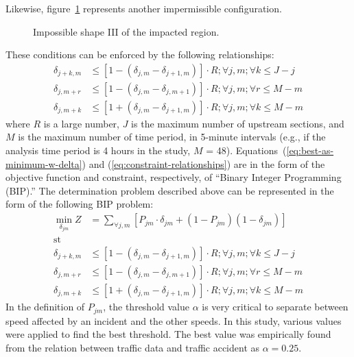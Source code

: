 \documentclass[12pt]{report}
\newcommand{\inputTikZ}[1]{%
    \begin{singlespace}
    \end{singlespace}
  }
\newcommand{\inputTikZ}[1]{%
    \begin{singlespace}
    \beginpgfgraphicnamed{#1-external}%
    \endpgfgraphicnamed%
    \end{singlespace}
  }
\newcounter{time}
\newcounter{space}
\begin{document}
Likewise, figure~\ref{fig:time-space-incident-schematic-infeasible-3}
represents another impermissible configuration.
\begin{figure}[t]
  \begin{center}
    \inputTikZ{figs/time-space-incident-schematic-infeasible-3}
    \caption[Impossible shape III of the impacted region]{Impossible shape III of the impacted region.}
    \label{fig:time-space-incident-schematic-infeasible-3}
  \end{center}
\end{figure}
These conditions can be enforced by the following relationships:
\begin{subequations}
  \label{eq:constraint-relationships}
  \begin{align}
    \label{eq:constraint-relationship-a}
    \delta_{j+k,m} &\le \left[1 - (\delta_{j,m} - \delta_{j+1,m})\right]\cdot{}R; \forall{}j, m; \forall{}k \le J - j\\
    \label{eq:constraint-relationship-b}        
    \delta_{j,m+r} & \le \left[1 - (\delta_{j,m} - \delta_{j,m+1})\right]\cdot{}R; \forall{}j, m; \forall{}r \le M - m\\
    \label{eq:constraint-relationship-c}            
    \delta_{j,m+k} & \le \left[1 + (\delta_{j,m} - \delta_{j+1,m})\right]\cdot{}R; \forall{}j, m; \forall{}k \le M - m
  \end{align}
\end{subequations}
where $R$ is a large number, $J$ is the maximum number of upstream
sections, and $M$ is the maximum number of time period, in 5-minute
intervals (e.g., if the analysis time period is 4 hours in the study,
$M$ = 48).  Equations~(\ref{eq:best-as-minimum-w-delta}) and
(\ref{eq:constraint-relationships}) are in the form of the objective
function and constraint, respectively, of ``Binary Integer Programming
(BIP).'' The determination problem described above can be represented
in the form of the following BIP problem:
\begin{equation}
  \begin{split}
  \label{eq:bip-formulation}
  \min\limits_{\delta_{jm}} Z & = \sum\limits_{\forall{}j,m}\left[P_{jm}\cdot{}\delta_{jm}+(1-P_{jm})(1-\delta_{jm})\right] \\
  \textrm{st}~~~~~~~~~&\\
    \delta_{j+k,m} &\le \left[1 - (\delta_{j,m} - \delta_{j+1,m})\right]\cdot{}R; \forall{}j, m; \forall{}k \le J - j\\
    \delta_{j,m+r} & \le \left[1 - (\delta_{j,m} - \delta_{j,m+1})\right]\cdot{}R; \forall{}j, m; \forall{}r \le M - m\\
    \delta_{j,m+k} & \le \left[1 + (\delta_{j,m} - \delta_{j+1,m})\right]\cdot{}R; \forall{}j, m; \forall{}k \le M - m
  \end{split}
\end{equation}
In the definition of $P_{jm}$, the threshold value $\alpha$ is very
critical to separate between speed affected by an incident and the
other speeds.  In this study, various values were applied to find the
best threshold. The best value was empirically found from the relation
between traffic data and traffic accident as $\alpha = 0.25$.
\end{document}
